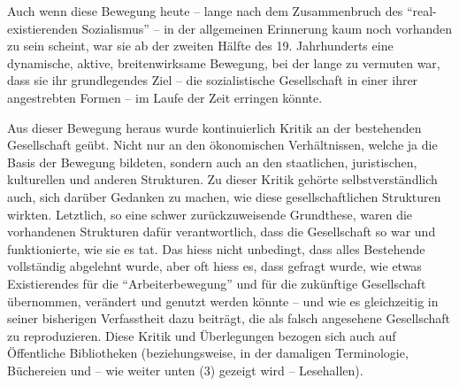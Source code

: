 \documentclass[a4paper,
fontsize=11pt,
oneside,
numbers=noperiodatend,
parskip=half-,
bibliography=totoc,
final
]{scrartcl}
\begin{document}
Auch wenn diese Bewegung heute -- lange nach dem Zusammenbruch des
\enquote{real-existierenden Sozialismus} -- in der allgemeinen
Erinnerung kaum noch vorhanden zu sein scheint, war sie ab der zweiten
Hälfte des 19. Jahrhunderts eine dynamische, aktive, breitenwirksame
Bewegung, bei der lange zu vermuten war, dass sie ihr grundlegendes Ziel
-- die sozialistische Gesellschaft in einer ihrer angestrebten Formen --
im Laufe der Zeit erringen könnte.

Aus dieser Bewegung heraus wurde kontinuierlich Kritik an der
bestehenden Gesellschaft geübt. Nicht nur an den ökonomischen
Verhältnissen, welche ja die Basis der Bewegung bildeten, sondern auch
an den staatlichen, juristischen, kulturellen und anderen Strukturen. Zu
dieser Kritik gehörte selbstverständlich auch, sich darüber Gedanken zu
machen, wie diese gesellschaftlichen Strukturen wirkten. Letztlich, so
eine schwer zurückzuweisende Grundthese, waren die vorhandenen
Strukturen dafür verantwortlich, dass die Gesellschaft so war und
funktionierte, wie sie es tat. Das hiess nicht unbedingt, dass alles
Bestehende vollständig abgelehnt wurde, aber oft hiess es, dass gefragt
wurde, wie etwas Existierendes für die \enquote{Arbeiterbewegung} und
für die zukünftige Gesellschaft übernommen, verändert und genutzt werden
könnte -- und wie es gleichzeitig in seiner bisherigen Verfasstheit dazu
beiträgt, die als falsch angesehene Gesellschaft zu reproduzieren. Diese
Kritik und Überlegungen bezogen sich auch auf Öffentliche Bibliotheken
(beziehungsweise, in der damaligen Terminologie, Büchereien und -- wie
weiter unten (3) gezeigt wird -- Lesehallen).
\end{document}
